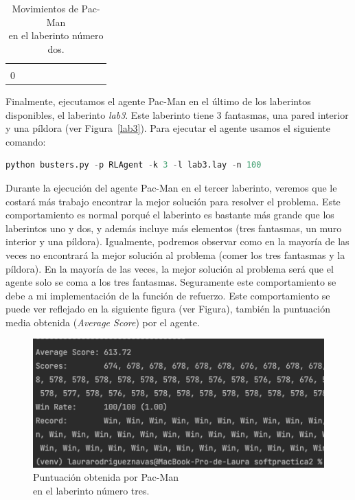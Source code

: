 \documentclass[11pt]{exam}
\begin{document}
\begin{table}[H]
\begin{tabular}{cccccccccc}
		\multicolumn{1}{c|}{} &
		\multicolumn{1}{c|}{} &
		\multicolumn{1}{c|}{} &
		\multicolumn{1}{c|}{} &
		\multicolumn{1}{c|}{} &
		\cellcolor[HTML]{000000} \\ \cline{2-9}
		\multicolumn{1}{c|}{0} &
		\multicolumn{1}{c|}{\cellcolor[HTML]{000000}} &
		\multicolumn{1}{c|}{\cellcolor[HTML]{000000}} &
		\multicolumn{1}{c|}{\cellcolor[HTML]{000000}} &
		\multicolumn{1}{c|}{\cellcolor[HTML]{000000}} &
		\multicolumn{1}{c|}{\cellcolor[HTML]{000000}} &
		\multicolumn{1}{c|}{\cellcolor[HTML]{000000}} &
		\multicolumn{1}{c|}{\cellcolor[HTML]{000000}} &
		\multicolumn{1}{c|}{\cellcolor[HTML]{000000}} &
		\cellcolor[HTML]{000000} \\ \cline{2-9}
	\end{tabular}
	\caption{Movimientos de Pac-Man \\ en el laberinto número dos.}
	\label{tabla_lab2}
\end{table}

Finalmente, ejecutamos el agente Pac-Man en el último de los laberintos disponibles, el laberinto \textit{lab3}. Este laberinto tiene 3 fantasmas, una pared interior y una píldora (ver Figura~\ref{lab3}). Para ejecutar el agente usamos el siguiente comando:

\begin{lstlisting}[language=python, basicstyle=\footnotesize]
python busters.py -p RLAgent -k 3 -l lab3.lay -n 100
\end{lstlisting}

Durante la ejecución del agente Pac-Man en el tercer laberinto, veremos que le costará más trabajo encontrar la mejor solución para resolver el problema. Este comportamiento es normal porqué el laberinto es bastante más grande que los laberintos uno y dos, y además incluye más elementos (tres fantasmas, un muro interior y una píldora). Igualmente, podremos observar como en la mayoría de las veces no encontrará la mejor solución al problema (comer los tres fantasmas y la píldora). En la mayoría de las veces, la mejor solución al problema será que el agente solo se coma a los tres fantasmas. Seguramente este comportamiento se debe a mi implementación de la función de refuerzo. Este comportamiento se puede ver reflejado en la siguiente figura (ver Figura), también la puntuación media obtenida (\textit{Average Score}) por el agente.

\begin{figure}[H]
	\centering
	\includegraphics[scale=0.6]{result_lab3}
	\caption{Puntuación obtenida por Pac-Man \\ en el laberinto número tres.}
	\label{result_lab3}
\end{figure}
\end{document}
